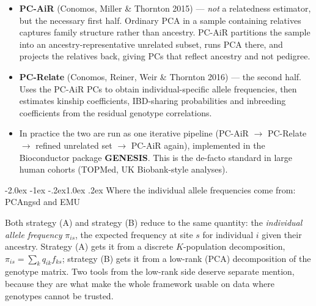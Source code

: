 \documentclass[10pt,a4paper]{article}
\makeatletter
\renewcommand\subsection{\@startsection{subsection}{2}{\z@}%
  {-2.0ex \@plus -1ex \@minus -.2ex}{1.0ex \@plus.2ex}%
  {\normalfont\normalsize\bfseries\color{hdr}}}
\newenvironment{tightitem}{%
  \begin{itemize}\setlength{\itemsep}{1pt}\setlength{\parskip}{0pt}%
  \setlength{\topsep}{3pt}\setlength{\parsep}{0pt}}{\end{itemize}}
\makeatother
\begin{document}
\begin{tightitem}
  \item \textbf{PC-AiR} (Conomos, Miller \& Thornton 2015) --- \emph{not} a relatedness estimator, but the
  necessary first half. Ordinary PCA in a sample containing relatives captures family structure rather than
  ancestry. PC-AiR partitions the sample into an ancestry-representative unrelated subset, runs PCA there,
  and projects the relatives back, giving PCs that reflect ancestry and not pedigree.
  \item \textbf{PC-Relate} (Conomos, Reiner, Weir \& Thornton 2016) --- the second half. Uses the PC-AiR PCs
  to obtain individual-specific allele frequencies, then estimates kinship coefficients, IBD-sharing
  probabilities and inbreeding coefficients from the residual genotype correlations.
  \item In practice the two are run as one iterative pipeline (PC-AiR $\rightarrow$ PC-Relate $\rightarrow$
  refined unrelated set $\rightarrow$ PC-AiR again), implemented in the Bioconductor package
  \textbf{GENESIS}. This is the de-facto standard in large human cohorts (TOPMed, UK Biobank-style analyses).
\end{tightitem}

\subsection{Where the individual allele frequencies come from: PCAngsd and EMU}

Both strategy (A) and strategy (B) reduce to the same quantity: the \emph{individual allele frequency}
$\pi_{is}$, the expected frequency at site $s$ for individual $i$ given their ancestry. Strategy (A) gets it
from a discrete $K$-population decomposition, $\pi_{is}=\sum_k q_{ik}f_{ks}$; strategy (B) gets it from a
low-rank (PCA) decomposition of the genotype matrix. Two tools from the low-rank side deserve separate
mention, because they are what make the whole framework usable on data where genotypes cannot be trusted.
\end{document}
